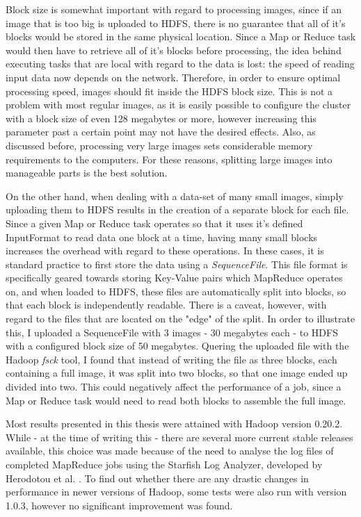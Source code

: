 \documentclass [12pt,a4paper]{report}
\begin{document}
Block size is somewhat important with regard to processing images, since if an image that is too big is uploaded to HDFS, there is no guarantee that all of it's blocks would be stored in the same physical location. Since a Map or Reduce task would then have to retrieve all of it's blocks before processing, the idea behind executing tasks that are local with regard to the data is lost: the speed of reading input data now depends on the network. Therefore, in order to ensure optimal processing speed, images should fit inside the HDFS block size. This is not a problem with most regular images, as it is easily possible to configure the cluster with a block size of even 128 megabytes or more, however increasing this parameter past a certain point may not have the desired effects. Also, as discussed before, processing very large images sets considerable memory requirements to the computers. For these reasons, splitting large images into manageable parts is the best solution.

On the other hand, when dealing with a data-set of many small images, simply uploading them to HDFS results in the creation of a separate block for each file. Since a given Map or Reduce task operates so that it uses it's defined InputFormat to read data one block at a time, having many small blocks increases the overhead with regard to these operations. In these cases, it is standard practice to first store the data using a \textit{SequenceFile}. This file format is specifically geared towards storing Key-Value pairs which MapReduce operates on, and when loaded to HDFS, these files are automatically split into blocks, so that each block is independently readable. There is a caveat, however, with regard to the files that are located on the "edge" of the split. In order to illustrate this, I uploaded a SequenceFile with 3 images - 30 megabytes each - to HDFS with a configured block size of 50 megabytes. Quering the uploaded file with the Hadoop \textit{fsck} tool, I found that instead of writing the file as three blocks, each containing a full image, it was split into two blocks, so that one image ended up divided into two. This could negatively affect the performance of a job, since a Map or Reduce task would need to read both blocks to assemble the full image.

Most results presented in this thesis were attained with Hadoop version 0.20.2. While - at the time of writing this - there are several more current stable releases available, this choice was made because of the need to analyse the log files of completed MapReduce jobs using the Starfish Log Analyzer, developed by Herodotou et al. \cite{herodotou2011starfish}. To find out whether there are any drastic changes in performance in newer versions of Hadoop, some tests were also run with version 1.0.3, however no significant improvement was found.
\end{document}
